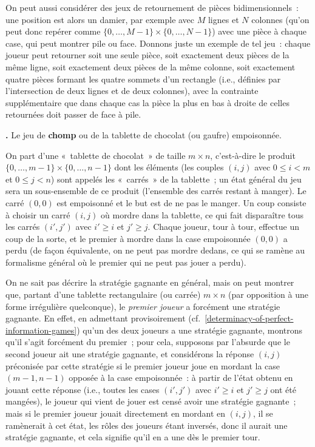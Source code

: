 \documentclass[12pt,a4paper]{article}
\theoremstyle{definition}
\newcommand\thingy{%
\refstepcounter{comcnt}\smallskip\noindent\textbf{\thecomcnt.} }
\newcommand{\defin}[2][]{\def\latexsucks{#1}\ifx\latexsucks\empty\index{#2}\else\index{\latexsucks}\fi\textbf{#2}}
\begin{document}
On peut aussi considérer des jeux de retournement de pièces
bidimensionnels : une position est alors un damier, par exemple avec
$M$ lignes et $N$ colonnes (qu'on peut donc repérer comme
$\{0,\ldots,M-1\} \times \{0,\ldots,N-1\}$) avec une pièce à chaque
case, qui peut montrer pile ou face.  Donnons juste un exemple de tel
jeu : chaque joueur peut retourner soit une seule pièce, soit
exactement deux pièces de la même ligne, soit exactement deux pièces
de la même colonne, soit exactement quatre pièces formant les quatre
sommets d'un rectangle (i.e., définies par l'intersection de deux
lignes et de deux colonnes), avec la contrainte supplémentaire que
dans chaque cas la pièce la plus en bas à droite de celles retournées
doit passer de face à pile.

\thingy Le jeu de \defin{chomp} ou de la tablette de chocolat (ou
gaufre) empoisonnée.

On part d'une « tablette de chocolat » de taille $m\times n$,
c'est-à-dire le produit $\{0,\ldots,m-1\} \times \{0,\ldots,n-1\}$
dont les éléments (les couples $(i,j)$ avec $0\leq i<m$ et $0\leq
j<n$) sont appelés les « carrés » de la tablette ; un état général du
jeu sera un sous-ensemble de ce produit (l'ensemble des carrés restant
à manger).  Le carré $(0,0)$ est empoisonné et le but est de ne pas le
manger.  Un coup consiste à choisir un carré $(i,j)$ où mordre dans la
tablette, ce qui fait disparaître tous les carrés $(i',j')$ avec
$i'\geq i$ et $j'\geq j$.  Chaque joueur, tour à tour, effectue un
coup de la sorte, et le premier à mordre dans la case empoisonnée
$(0,0)$ a perdu (de façon équivalente, on ne peut pas mordre dedans,
ce qui se ramène au formalisme général où le premier qui ne peut pas
jouer a perdu).

On ne sait pas décrire la stratégie gagnante en général, mais on peut
montrer que, partant d'une tablette rectangulaire (ou carrée) $m\times
n$ (par opposition à une forme irrégulière quelconque), le
\emph{premier joueur} a forcément une stratégie gagnante.  En effet,
en admettant provisoirement
(cf. \ref{determinacy-of-perfect-information-games}) qu'un des deux
joueurs a une stratégie gagnante, montrons qu'il s'agit forcément du
premier ; pour cela, supposons par l'absurde que le second joueur ait
une stratégie gagnante, et considérons la réponse $(i,j)$ préconisée
par cette stratégie si le premier joueur joue en mordant la case
$(m-1,n-1)$ opposée à la case empoisonnée : à partir de l'état obtenu
en jouant cette réponse (i.e., toutes les cases $(i',j')$ avec $i'\geq
i$ et $j'\geq j$ ont été mangées), le joueur qui vient de jouer est
censé avoir une stratégie gagnante ; mais si le premier joueur jouait
directement en mordant en $(i,j)$, il se ramènerait à cet état, les
rôles des joueurs étant inversés, donc il aurait une stratégie
gagnante, et cela signifie qu'il en a une dès le premier tour.
\end{document}
